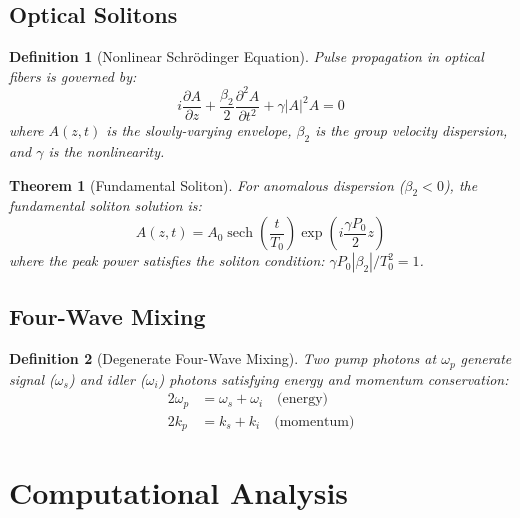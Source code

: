 \documentclass[a4paper, 11pt]{article}
\newtheorem{definition}{Definition}[section]
\newtheorem{theorem}{Theorem}[section]
\begin{document}
\subsection{Optical Solitons}

\begin{definition}[Nonlinear Schrödinger Equation]
Pulse propagation in optical fibers is governed by:
\begin{equation}
i\frac{\partial A}{\partial z} + \frac{\beta_2}{2}\frac{\partial^2 A}{\partial t^2} +
\gamma |A|^2 A = 0
\end{equation}
where $A(z,t)$ is the slowly-varying envelope, $\beta_2$ is the group velocity dispersion,
and $\gamma$ is the nonlinearity.
\end{definition}

\begin{theorem}[Fundamental Soliton]
For anomalous dispersion ($\beta_2 < 0$), the fundamental soliton solution is:
\begin{equation}
A(z,t) = A_0 \operatorname{sech}\left(\frac{t}{T_0}\right)
\exp\left(i\frac{\gamma P_0}{2}z\right)
\end{equation}
where the peak power satisfies the soliton condition: $\gamma P_0 |\beta_2|/T_0^2 = 1$.
\end{theorem}

\subsection{Four-Wave Mixing}

\begin{definition}[Degenerate Four-Wave Mixing]
Two pump photons at $\omega_p$ generate signal ($\omega_s$) and idler ($\omega_i$) photons
satisfying energy and momentum conservation:
\begin{align}
2\omega_p &= \omega_s + \omega_i \quad \text{(energy)} \\
2k_p &= k_s + k_i \quad \text{(momentum)}
\end{align}
\end{definition}

\section{Computational Analysis}
\end{document}
